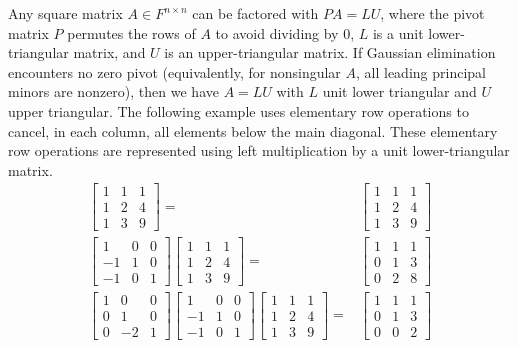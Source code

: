 Any square matrix $A \in F^{n \times n}$ can be factored with $PA = LU$, where the pivot matrix $P$ permutes the rows of $A$ to avoid dividing by 0, $L$ is a unit lower-triangular matrix, and $U$ is an upper-triangular matrix.
If Gaussian elimination encounters no zero pivot (equivalently, for nonsingular $A$, all leading principal minors are nonzero), then we have $A=LU$ with $L$ unit lower triangular and $U$ upper triangular. 
The following example uses elementary row operations to cancel, in each column, all elements below the main diagonal.
These elementary row operations are represented using left multiplication by a unit lower-triangular matrix.
\begin{align*}
\begin{bmatrix} 1 & 1 & 1 \\ 1 & 2 & 4 \\ 1 & 3 & 9 \end{bmatrix}
= & \begin{bmatrix} 1 & 1 & 1 \\ 1 & 2 & 4 \\ 1 & 3 & 9 \end{bmatrix} \\
\begin{bmatrix} 1 & 0 & 0 \\ -1 & 1 & 0 \\ -1 & 0 & 1 \end{bmatrix}
\begin{bmatrix} 1 & 1 & 1 \\ 1 & 2 & 4 \\ 1 & 3 & 9 \end{bmatrix}
= & \begin{bmatrix} 1 & 1 & 1 \\ 0 & 1 & 3 \\ 0 & 2 & 8 \end{bmatrix} \\
\begin{bmatrix} 1 & 0 & 0 \\ 0 & 1 & 0 \\ 0 & -2 & 1 \end{bmatrix}
\begin{bmatrix} 1 & 0 & 0 \\ -1 & 1 & 0 \\ -1 & 0 & 1 \end{bmatrix}
\begin{bmatrix} 1 & 1 & 1 \\ 1 & 2 & 4 \\ 1 & 3 & 9 \end{bmatrix}
= & \begin{bmatrix} 1 & 1 & 1 \\ 0 & 1 & 3 \\ 0 & 0 & 2 \end{bmatrix}
\end{align*}
